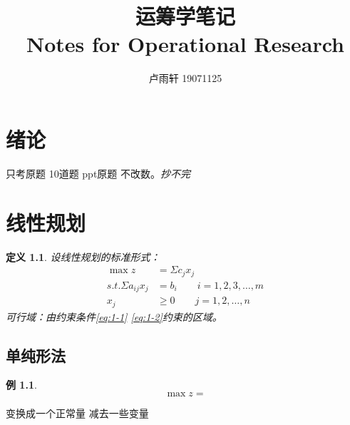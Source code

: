 \documentclass{ctexbook}
\title{运筹学笔记 \\
Notes for Operational Research}
\author{卢雨轩 19071125}
\newtheorem{definition}{定义}[section]
\newtheorem{example}{例}[section]
\begin{document}
\maketitle

\chapter*{绪论}

只考原题 10道题 ppt原题 不改数。\emph{抄不完}

\chapter{线性规划}


\begin{definition}
  设线性规划的标准形式：
\begin{align}
  \max z &= \Sigma c_j x_j \\
  \label{eq:1-1} s.t. \Sigma a_{ij}x_j &= b_i \qquad i = 1,2,3,\dots,m \\
  \label{eq:1-2} x_j &\ge 0 \qquad j = 1,2,\dots, n
\end{align}
  可行域：由约束条件\ref{eq:1-1} \ref{eq:1-2}约束的区域。


\end{definition}

\section{单纯形法}
\begin{example}
  \begin{equation}
    \max z = 
  \end{equation}
\end{example}

变换成一个正常量 减去一些变量
\end{document}
